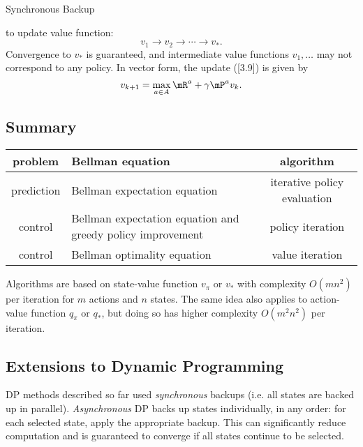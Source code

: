\documentclass[RL]{subfiles}
\begin{document}
    \begin{algorithm}{Synchronous Backup}
    \end{algorithm}
    
    \np\noindent
    to update value function:
    \begin{equation*}
        v_1 \to v_2 \to \cdots \to v_*.
    \end{equation*}
    Convergence to $v_*$ is guaranteed, and intermediate value functions $v_1,\ldots$ may not correspond to any policy. In vector form, the update ([3.9]) is given by
    \begin{equation}
        v_{k+1} = \max_{a\in A} \mR^a + \gamma\mP^a v_k.
    \end{equation}

    \subsection{Summary}
    
    \noindent
    \begin{tabularx}{\textwidth}{|c|Y|c|}
        \hline
        problem & Bellman equation & algorithm \\
        \hline
        prediction & Bellman expectation equation & iterative policy evaluation \\
        \hline
        control & Bellman expectation equation and greedy policy improvement & policy iteration \\
        \hline
        control & Bellman optimality equation & value iteration \\
        \hline
    \end{tabularx}

    \np Algorithms are based on state-value function $v_{\pi}$ or $v_*$ with complexity $O\left( mn^{2} \right)$ per iteration for $m$ actions and $n$ states. The same idea also applies to action-value function $q_{\pi}$ or $q_*$, but doing so has higher complexity $O\left( m^{2}n^{2} \right)$ per iteration.
    
    \subsection{Extensions to Dynamic Programming}

    DP methods described so far used \textit{synchronous} backups (i.e. all states are backed up in parallel). \textit{Asynchronous} DP backs up states individually, in any order: for each selected state, apply the appropriate backup. This can significantly reduce computation and is guaranteed to converge if all states continue to be selected.
\end{document}
